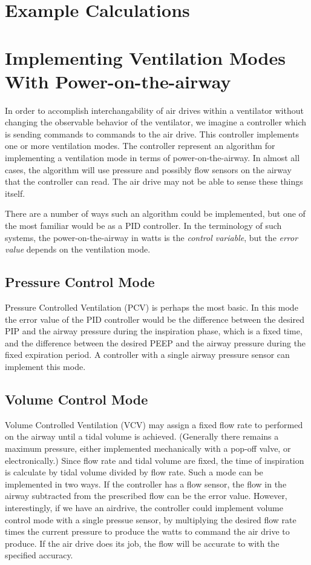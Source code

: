\documentclass[conference]{article}
\begin{document}
\section{Example Calculations}



\section{Implementing Ventilation Modes With Power-on-the-airway}

In order to accomplish interchangability of air drives within a ventilator without
changing the observable behavior of the ventilator, we imagine a controller which
is sending commands to commands to the air drive.
This controller implements one or more ventilation modes.
The controller represent an algorithm for implementing a ventilation mode
in terms of power-on-the-airway. In almost all cases, the algorithm will use
pressure and possibly flow sensors on the airway that the controller can read.
The air drive may not be able to sense these things itself.

There are a number of ways such an algorithm could be implemented, but
one of the most familiar would be as a PID controller. In the terminology
of such systems, the power-on-the-airway in watts is the {\em control variable},
but the {\em error value} depends on the ventilation mode.

\subsection{Pressure Control Mode}

Pressure Controlled Ventilation (PCV) is perhaps the most basic.
In this mode the error value of the PID controller would be the difference
between the desired PIP and the airway pressure during the inspiration phase,
which is a fixed time, and the difference between the desired PEEP and the
airway pressure during the fixed expiration period. A controller with a single
airway pressure sensor can implement this mode.

\subsection{Volume Control Mode}

Volume Controlled Ventilation (VCV) may assign a fixed flow rate to
performed on the airway until a tidal volume is achieved.
(Generally there remains
a maximum pressure, either implemented mechanically with a pop-off valve,
or electronically.)
Since
flow rate and tidal volume are fixed, the time of inspiration
is calculate by tidal volume divided by flow rate.
Such a mode can be implemented in two ways. If the controller
has a flow sensor, the flow in the airway subtracted from the
prescribed flow can be the error value. However, interestingly, if
we have an airdrive, the controller could implement volume control mode with a single
pressue sensor, by multiplying the desired flow rate times the current pressure
to produce the watts to command the air drive to produce. If the air drive does its
job, the flow will be accurate to with the specified accuracy.
\end{document}
